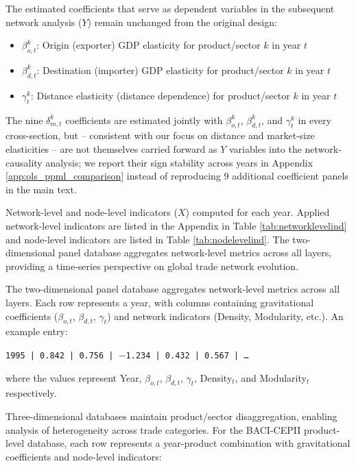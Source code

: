 \documentclass[preprint, 3p,
authoryear]{elsarticle} %
\begin{document}
\noindent The estimated coefficients that serve as dependent variables
in the subsequent network analysis (\(Y\)) remain unchanged from the
original design:

\begin{itemize}
    \item $\beta_{o,t}^{k}$: Origin (exporter) GDP elasticity for product/sector $k$ in year $t$
    \item $\beta_{d,t}^{k}$: Destination (importer) GDP elasticity for product/sector $k$ in year $t$
    \item $\gamma_t^{k}$: Distance elasticity (distance dependence) for product/sector $k$ in year $t$
\end{itemize}

\noindent The nine \(\delta_{m,t}^{k}\) coefficients are estimated
jointly with \(\beta_{o,t}^{k}\), \(\beta_{d,t}^{k}\), and
\(\gamma_t^{k}\) in every cross-section, but -- consistent with our
focus on distance and market-size elasticities -- are not themselves
carried forward as \(Y\) variables into the network-causality analysis;
we report their sign stability across years in Appendix
\ref{app:ols_ppml_comparison} instead of reproducing 9 additional
coefficient panels in the main text.

Network-level and node-level indicators (\(X\)) computed for each year.
Applied network-level indicators are listed in the Appendix in Table
\ref{tab:networklevelind} and node-level indicators are listed in Table
\ref{tab:nodelevelind}. The two-dimensional panel database aggregates
network-level metrics across all layers, providing a time-series
perspective on global trade network evolution.

The two-dimensional panel database aggregates network-level metrics
across all layers. Each row represents a year, with columns containing
gravitational coefficients (\(\beta_{o,t}\), \(\beta_{d,t}\),
\(\gamma_t\)) and network indicators (Density, Modularity, etc.). An
example entry:

\begin{center}
\texttt{1995 | 0.842 | 0.756 | $-$1.234 | 0.432 | 0.567 | \ldots}
\end{center}

\noindent where the values represent Year, \(\beta_{o,t}\),
\(\beta_{d,t}\), \(\gamma_t\), Density\(_t\), and Modularity\(_t\)
respectively.

Three-dimensional databases maintain product/sector disaggregation,
enabling analysis of heterogeneity across trade categories. For the
BACI-CEPII product-level database, each row represents a year-product
combination with gravitational coefficients and node-level indicators:
\end{document}
